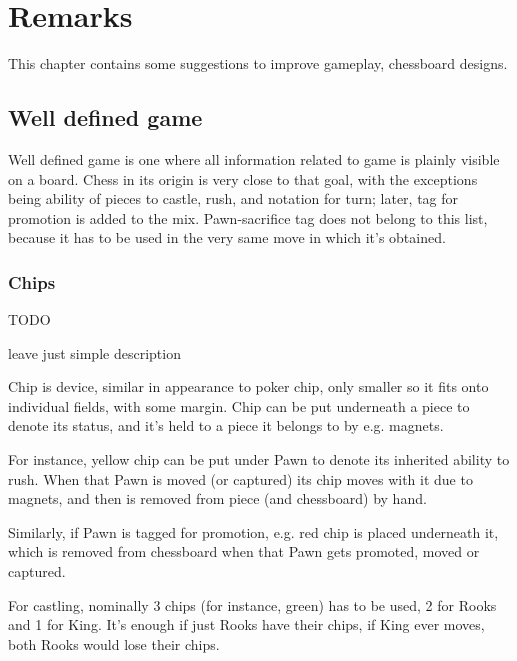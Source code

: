

\chapter*{Remarks}
\label{ch:Remarks}

This chapter contains some suggestions to improve gameplay, chessboard
designs.

\section*{Well defined game}
\label{sec:Remarks/Well defined game}

Well defined game is one where all information related to game is plainly
visible on a board. Chess in its origin is very close to that goal, with
the exceptions being ability of pieces to castle, rush, and notation for
turn; later, tag for promotion is added to the mix. Pawn-sacrifice tag
does not belong to this list, because it has to be used in the very same
move in which it's obtained.

\subsection*{Chips}
\label{sec:Remarks/Chips}

\huge
TODO
\normalsize

leave just simple description


Chip is device, similar in appearance to poker chip, only smaller so it fits
onto individual fields, with some margin. Chip can be put underneath a piece
to denote its status, and it's held to a piece it belongs to by e.g. magnets.

For instance, yellow chip can be put under Pawn to denote its inherited ability
to rush. When that Pawn is moved (or captured) its chip moves with it due to
magnets, and then is removed from piece (and chessboard) by hand.

Similarly, if Pawn is tagged for promotion, e.g. red chip is placed underneath
it, which is removed from chessboard when that Pawn gets promoted, moved or
captured.

For castling, nominally 3 chips (for instance, green) has to be used, 2 for
Rooks and 1 for King. It's enough if just Rooks have their chips, if King ever
moves, both Rooks would lose their chips.

